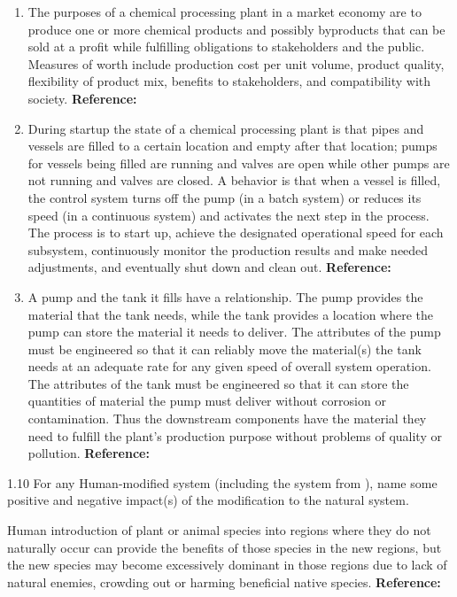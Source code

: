 \begin{exsol@solution}{}
        \begin{enumerate}[label=\alph*)]
            \item The purposes of a chemical processing plant in a market economy are to produce one or more chemical products and possibly byproducts that can be sold at a profit while fulfilling obligations to stakeholders and the public. Measures of worth include production cost per unit volume, product quality, flexibility of product mix, benefits to stakeholders, and compatibility with society. \textbf{Reference:}
            \item During startup the state of a chemical processing plant is that pipes and vessels are filled to a certain location and empty after that location; pumps for vessels being filled are running and valves are open while other pumps are not running and valves are closed. A behavior is that when a vessel is filled, the control system turns off the pump (in a batch system) or reduces its speed (in a continuous system) and activates the next step in the process. The process is to start up, achieve the designated operational speed for each subsystem, continuously monitor the production results and make needed adjustments, and eventually shut down and clean out. \textbf{Reference:}
            \item A pump and the tank it fills have a relationship. The pump provides the material that the tank needs, while the tank provides a location where the pump can store the material it needs to deliver. The attributes of the pump must be engineered so that it can reliably move the material(s) the tank needs at an adequate rate for any given speed of overall system operation. The attributes of the tank must be engineered so that it can store the quantities of material the pump must deliver without corrosion or contamination. Thus the downstream components have the material they need to fulfill the plant’s production purpose without problems of quality or pollution. \textbf{Reference:}
        \end{enumerate}
\end{exsol@solution}
\begin{exsol@exercise}{1.10}
    \label{sea-1-14}
        For any Human-modified system (including the system from ), name some positive and negative impact(s) of the modification to the natural system.
\end{exsol@exercise}
\begin{exsol@solution}{}
        Human introduction of plant or animal species into regions where they do not naturally occur can provide the benefits of those species in the new regions, but the new species may become excessively dominant in those regions due to lack of natural enemies, crowding out or harming beneficial native species. \textbf{Reference:}
\end{exsol@solution}
